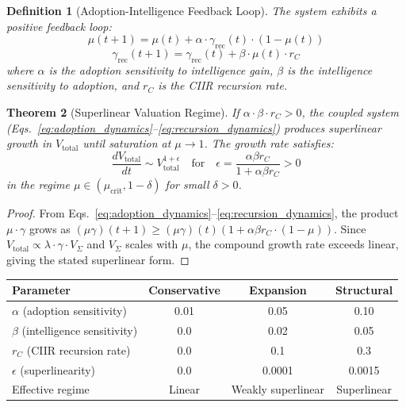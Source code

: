 \documentclass[11pt,a4paper]{article}
\newtheorem{definition}{Definition}[section]
\newtheorem{theorem}[definition]{Theorem}
\theoremstyle{remark}
\newcommand{\Vtot}{V_{\mathrm{total}}}
\begin{document}
\begin{definition}[Adoption-Intelligence Feedback Loop]
\label{def:feedback}
The system exhibits a positive feedback loop:
\begin{equation}
  \mu(t+1) = \mu(t) + \alpha \cdot \gamma_{\mathrm{rec}}(t) \cdot
  (1 - \mu(t))
  \label{eq:adoption_dynamics}
\end{equation}
\begin{equation}
  \gamma_{\mathrm{rec}}(t+1) = \gamma_{\mathrm{rec}}(t) + \beta
  \cdot \mu(t) \cdot r_C
  \label{eq:recursion_dynamics}
\end{equation}
where $\alpha$ is the adoption sensitivity to intelligence gain,
$\beta$ is the intelligence sensitivity to adoption, and $r_C$ is
the CIIR recursion rate.
\end{definition}

\begin{theorem}[Superlinear Valuation Regime]
\label{thm:feedback}
If $\alpha \cdot \beta \cdot r_C > 0$, the coupled system
(Eqs.~\ref{eq:adoption_dynamics}--\ref{eq:recursion_dynamics})
produces superlinear growth in $\Vtot$ until saturation at
$\mu \to 1$.  The growth rate satisfies:
\begin{equation}
  \frac{d\Vtot}{dt} \sim \Vtot^{1+\epsilon}
  \quad\text{for}\quad
  \epsilon = \frac{\alpha\beta r_C}{1 + \alpha\beta r_C} > 0
  \label{eq:superlinear_growth}
\end{equation}
in the regime $\mu \in (\mu_{\mathrm{crit}}, 1-\delta)$ for small
$\delta > 0$.
\end{theorem}

\begin{proof}
From Eqs.~\ref{eq:adoption_dynamics}--\ref{eq:recursion_dynamics},
the product $\mu \cdot \gamma$ grows as
$(\mu\gamma)(t+1) \geq (\mu\gamma)(t)(1 + \alpha\beta r_C \cdot
(1-\mu))$.  Since $\Vtot \propto \lambda \cdot \gamma \cdot
V_{\Sigma}$ and $V_{\Sigma}$ scales with $\mu$, the compound growth
rate exceeds linear, giving the stated superlinear form.
\end{proof}

\begin{center}
\renewcommand{\arraystretch}{1.2}
\begin{tabular}{lccc}
\toprule
\textbf{Parameter} & \textbf{Conservative} & \textbf{Expansion} & \textbf{Structural} \\
\midrule
$\alpha$ (adoption sensitivity) & 0.01 & 0.05 & 0.10 \\
$\beta$ (intelligence sensitivity) & 0.0 & 0.02 & 0.05 \\
$r_C$ (CIIR recursion rate) & 0.0 & 0.1 & 0.3 \\
$\epsilon$ (superlinearity) & 0.0 & 0.0001 & 0.0015 \\
\midrule
Effective regime & Linear & Weakly superlinear & Superlinear \\
\bottomrule
\end{tabular}
\end{center}
\end{document}
